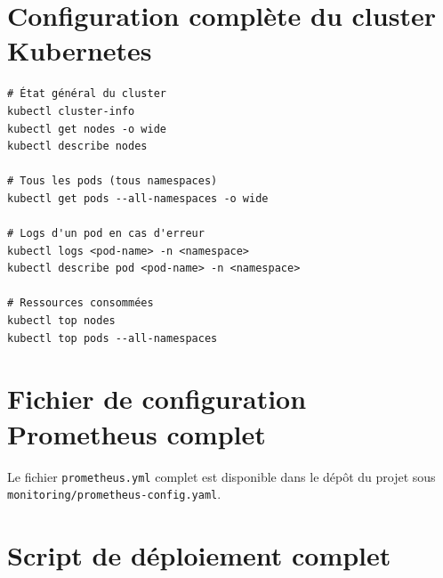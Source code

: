 \documentclass[12pt,a4paper,french]{report}
\begin{document}
\appendix

\chapter{Configuration complète du cluster Kubernetes}
\label{annex:kubeconfig}

\begin{lstlisting}[style=bash, caption={Commandes de diagnostic du cluster}]
# État général du cluster
kubectl cluster-info
kubectl get nodes -o wide
kubectl describe nodes

# Tous les pods (tous namespaces)
kubectl get pods --all-namespaces -o wide

# Logs d'un pod en cas d'erreur
kubectl logs <pod-name> -n <namespace>
kubectl describe pod <pod-name> -n <namespace>

# Ressources consommées
kubectl top nodes
kubectl top pods --all-namespaces
\end{lstlisting}

\chapter{Fichier de configuration Prometheus complet}
\label{annex:prometheus-config}

Le fichier \texttt{prometheus.yml} complet est disponible dans le dépôt du projet sous \texttt{monitoring/prometheus-config.yaml}.

\chapter{Script de déploiement complet}
\label{annex:deploy-script}
\end{document}
